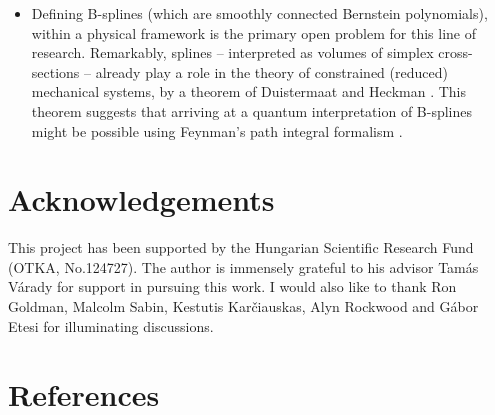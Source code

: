 \documentclass[final,3p,mathptmx]{elsarticle}
\begin{document}
\begin{itemize}
	\item Defining B-splines (which are smoothly connected Bernstein polynomials), within a physical framework is the primary open problem for this line of research. Remarkably, splines -- interpreted as volumes of simplex cross-sections \cite{deconcini2010topics,cohen1987cones} -- already play a role in the theory of constrained (reduced) mechanical systems, by a theorem of Duistermaat and Heckman \cite{duistermaat1982variation,atiyah1983angular}. This theorem suggests that arriving at a quantum interpretation of B-splines might be possible using Feynman's path integral formalism \cite{szabo2003equivariant}.   
\end{itemize}

\section*{Acknowledgements}
This project has been supported by the Hungarian Scientific Research Fund (OTKA, No.124727). The author is immensely grateful to his advisor Tam\'{a}s V\'{a}rady for support in pursuing this work. I would also like to thank Ron Goldman, Malcolm Sabin, Kestutis Kar\v{c}iauskas, Alyn Rockwood and G\'{a}bor Etesi for illuminating discussions. 

\section*{References}


\end{document}
